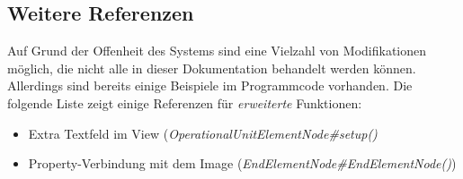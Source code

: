 \pagebreak
\subsection{Weitere Referenzen}
Auf Grund der Offenheit des Systems sind eine Vielzahl von Modifikationen möglich, die nicht alle in dieser
Dokumentation behandelt werden können. Allerdings sind bereits einige Beispiele im Programmcode vorhanden.
Die folgende Liste zeigt einige Referenzen für \textit{erweiterte} Funktionen:

\begin{itemize}
	\item Extra Textfeld im View (\textit{OperationalUnitElementNode\#setup()}
	\item Property-Verbindung mit dem Image (\textit{EndElementNode\#EndElementNode()})
\end{itemize}